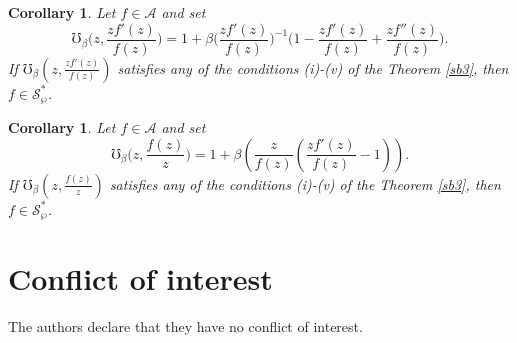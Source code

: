 \documentclass[12pt, reqno]{amsart}
\numberwithin{equation}{section}
\theoremstyle{plain}
\newtheorem{corollary}[theorem]{Corollary}
\theoremstyle{definition}
\theoremstyle{remark}
\begin{document}
\begin{corollary}
	Let $f\in\mathcal{A}$ and set
	\begin{equation*}
	\mho_\beta\biggl(z,\frac{zf'(z)}{f(z)}\biggl)=1+\beta\biggl(\frac{zf'(z)}{f(z)}\biggl)^{-1}\biggl(1-\frac{zf'(z)}{f(z)}+\frac{zf''(z)}{f(z)}\biggl).    	
	\end{equation*}
	If $ \mho_\beta\left(z,\frac{zf'(z)}{f(z)}\right)$ satisfies any of the conditions (i)-(v) of the Theorem \ref{sb3}, then $ f\in \mathcal{S}^*_{\wp} $.
\end{corollary}
\begin{corollary}
	Let $f\in\mathcal{A}$ and set
	\begin{equation*}
	\mho_\beta\biggl(z,\frac{f(z)}{z}\biggl)=1+\beta\left(\frac{z}{f(z)}\left(\frac{zf'(z)}{f(z)}-1\right)\right).    	
	\end{equation*}
	If $ \mho_\beta\left(z,\frac{f(z)}{z}\right)$ satisfies any of the conditions (i)-(v) of the Theorem \ref{sb3}, then $ f\in \mathcal{S}^*_{\wp} $.
\end{corollary}

	
	
	
	
\section*{Conflict of interest}
	The authors declare that they have no conflict of interest.
\end{document}
